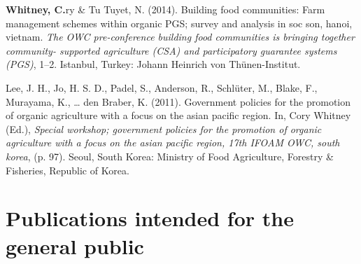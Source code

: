 \documentclass[11pt,a4paper,]{awesome-cv}
\newlength{\cslhangindent}
\newenvironment{CSLReferences}[2] %
 {\begin{list}{}{%
  \setlength{\itemindent}{0pt}
  \setlength{\leftmargin}{0pt}
  \setlength{\parsep}{0pt}
  \ifodd #1
   \setlength{\leftmargin}{\cslhangindent}
   \setlength{\itemindent}{-1\cslhangindent}
  \fi
  \setlength{\itemsep}{#2\baselineskip}}}
 {\end{list}}
\begin{document}
\begin{CSLReferences}{1}{0}
\textbf{Whitney, C.}ry \& Tu Tuyet, N. (2014). Building food
communities: Farm management schemes within organic PGS; survey and
analysis in soc son, hanoi, vietnam. \emph{The OWC pre-conference
building food communities is bringing together community- supported
agriculture (CSA) and participatory guarantee systems (PGS)}, 1--2.
Istanbul, Turkey: Johann Heinrich von Thünen-Institut.

Lee, J. H., Jo, H. S. D., Padel, S., Anderson, R., Schlüter, M., Blake,
F., Murayama, K., \ldots{} den Braber, K. (2011). Government policies
for the promotion of organic agriculture with a focus on the asian
pacific region. In, Cory Whitney (Ed.), \emph{Special workshop;
government policies for the promotion of organic agriculture with a
focus on the asian pacific region, 17th IFOAM OWC, south korea}, (p.
97). Seoul, South Korea: Ministry of Food Agriculture, Forestry \&
Fisheries, Republic of Korea.

\end{CSLReferences}

\section{Publications intended for the general
public}\label{publications-intended-for-the-general-public}
\end{document}
